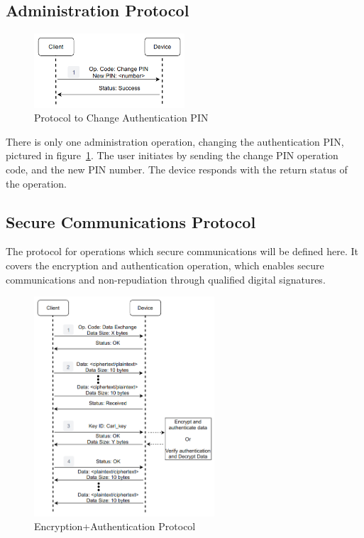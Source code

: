 \subsection{Administration Protocol}\label{chap:solution:protocol:admin}
\begin{figure}[h]
	\centering
	\includegraphics[width=0.5\textwidth]{./Images/change-PIN.png}
	\caption{Protocol to Change Authentication PIN}
	\label{fig:protocol:change-PIN}
\end{figure}

There is only one administration operation, changing the authentication \ac{PIN}, pictured in figure~\ref{fig:protocol:change-PIN}.
The user initiates by sending the change \ac{PIN} operation code, and the new \ac{PIN} number. The device responds with the return status of the operation.

\subsection{Secure Communications Protocol}\label{chap:solution:protocol:comms}

The protocol for operations which secure communications will be defined here. It covers the encryption and authentication operation, which enables secure communications and non-repudiation through qualified digital signatures.

\begin{figure}[h]
	\centering
	\includegraphics[width=0.6\textwidth]{./Images/data-exchange.png}
	\caption{Encryption+Authentication Protocol}
	\label{fig:protocol:data-exchange}
\end{figure}

